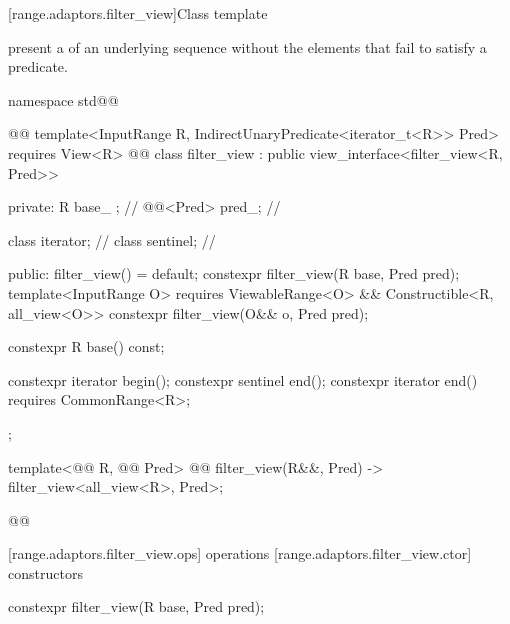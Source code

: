 [range.adaptors.filter_view]{Class template }

\pnum
{}   present a
 of an underlying sequence without the
elements that fail to satisfy a predicate.

\pnum
\begin{example}
\end{example}

\begin{codeblock}
namespace std@@ { @@
  template<InputRange R, IndirectUnaryPredicate<iterator_t<R>> Pred>
    requires View<R> @@
  class filter_view : public view_interface<filter_view<R, Pred>> {
  private:
    R base_ {}; // \expos
    @@<Pred> pred_; // \expos

    class iterator; // \expos
    class sentinel; // \expos

  public:
    filter_view() = default;
    constexpr filter_view(R base, Pred pred);
    template<InputRange O>
      requires ViewableRange<O> && Constructible<R, all_view<O>>
    constexpr filter_view(O&& o, Pred pred);

    constexpr R base() const;

    constexpr iterator begin();
    constexpr sentinel end();
    constexpr iterator end() requires CommonRange<R>;
  };

  template<@@ R, @@ Pred>
    @@
  filter_view(R&&, Pred) -> filter_view<all_view<R>, Pred>;
}@\oldtxt{\}}@
\end{codeblock}

[range.adaptors.filter_view.ops]{ operations}
[range.adaptors.filter_view.ctor]{ constructors}

%
\begin{itemdecl}
constexpr filter_view(R base, Pred pred);
\end{itemdecl}

